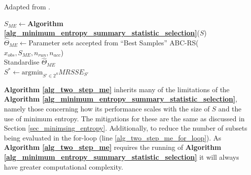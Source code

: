 \documentclass[11pt,a4paper]{article}
\theoremstyle{break}
\begin{document}
  \begin{box_algorithm}\label{alg_two_step_me}
    Adapted from \cite[]{on_optimal_selection_of_summary_stats_for_ABC}.
    \par
    \begin{algorithm}[H]
      $S_{ME}\leftarrow$\textbf{Algorithm \ref{alg_minimum_entropy_summary_statistic_selection}}($S$)\\
      $\hat{\Theta}_{ME}\leftarrow$Parameter sets accepted from ``Best Samples'' ABC-RS($x_{obs},S_{ME},n_{run},n_{acc}$)\\
      Standardise $\hat\Theta_{ME}$\\
      $S^*\leftarrow\text{argmin}_{S'\in 2^S}MRSSE_{S'}$\\
    \end{algorithm}
  \end{box_algorithm}

  \par \textbf{Algorithm \ref{alg_two_step_me}} inherits many of the limitations of the \textbf{Algorithm \ref{alg_minimum_entropy_summary_statistic_selection}}, namely those concerning how its performance scales with the size of $S$ and the use of minimum entropy. The mitigations for these are the same as discussed in Section \ref{sec_minimsing_entropy}. Additionally, to reduce the number of subsets being evaluated in the for-loop (line \ref{alg_two_step_me_for_loop}). As \textbf{Algorithm \ref{alg_two_step_me}} requires the running of \textbf{Algorithm \ref{alg_minimum_entropy_summary_statistic_selection}} it will always have greater computational complexity.


\end{document}

